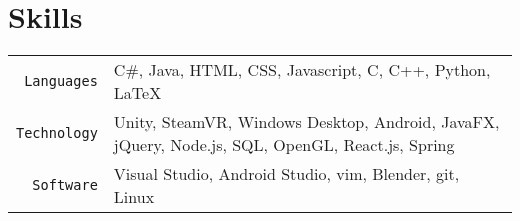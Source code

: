 \documentclass[10pt, letterpaper]{article}
\begin{document}
\begin{comment}
\texttt{10/2018} & \textbf{Music Manager} \\
\textbar & \textit{Individual Developer} \\
\texttt{Present} & \begin{itemize}
\item Completed a music file tag manager using C\# and WPF framework. this Windows application can play music and manage music ID3 tags.
\end{itemize} \\
\end{comment}

\begin{comment}
\section{Awards}
\smallskip
\noindent
\begin{tabularx}{\linewidth}{X r}
	10th place at UCSD WIC Beginner's Programming Competition & \texttt{06/2017}
\end{tabularx}
\end{comment}

\section{Skills}
\smallskip
\noindent
\begin{tabularx}{\linewidth}{r X}
	\texttt{Languages} & C\#, Java, HTML, CSS, Javascript, C, C++, Python, \LaTeX \\
	\texttt{Technology} & Unity, SteamVR, Windows Desktop, Android, JavaFX, jQuery, Node.js, SQL, OpenGL, React.js, Spring \\
	\texttt{Software} & Visual Studio, Android Studio, vim, Blender, git, Linux
\end{tabularx}

\begin{comment}
\section{Interests}
\smallskip
\noindent
I am fascinated by popular art (comics, games as well as rock music) and always wonder how far computers can take me in creating art. This leads me to minor in Visual Arts.
\end{comment}
\end{document}

